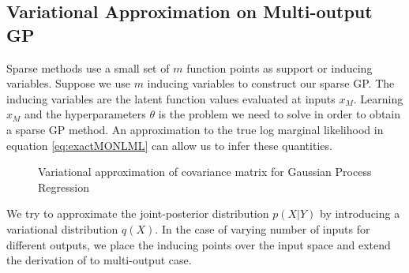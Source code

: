\subsection{Variational Approximation on Multi-output GP}\label{sec:varMOGP}
Sparse methods use a small set of \(m\) function points as support or inducing variables. Suppose we use \(m\) inducing variables to construct our sparse GP. The inducing variables are the latent function values evaluated at inputs \(x_{M}\). Learning \(x_{M}\) and the hyperparameters \(\theta\) is the problem we need to solve in order to obtain a sparse GP method. An approximation to the true log marginal likelihood in equation \ref{eq:exactMONLML} can allow us to infer these quantities.

\begin{figure}[!t]
  \centering
  \quad
  \caption{Variational approximation of covariance matrix for Gaussian Process Regression}
\end{figure}


We try to approximate the joint-posterior distribution \(p(X| Y)\) by introducing a variational distribution \(q(X)\). In the case of varying number of inputs for different outputs, we place the inducing points over the input space and extend the derivation of \cite{Titsias09variationallearning} to multi-output case. 

